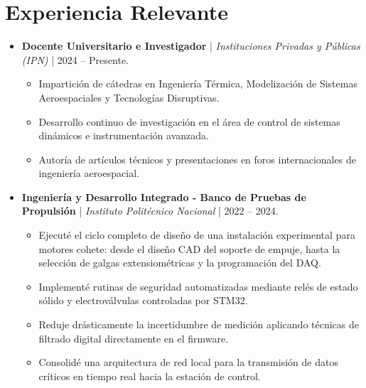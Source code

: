 \documentclass[10pt,letterpaper]{article}
\begin{document}
\section*{Experiencia Relevante}
\begin{itemize}[leftmargin=*, itemsep=0.5ex]
    \item \textbf{Docente Universitario e Investigador} | \textit{Instituciones Privadas y Públicas (IPN)} | 2024 -- Presente.
    \begin{itemize}[itemsep=0.1ex]
        \item Impartición de cátedras en Ingeniería Térmica, Modelización de Sistemas Aeroespaciales y Tecnologías Disruptivas.
        \item Desarrollo continuo de investigación en el área de control de sistemas dinámicos e instrumentación avanzada.
        \item Autoría de artículos técnicos y presentaciones en foros internacionales de ingeniería aeroespacial.
    \end{itemize}
    \item \textbf{Ingeniería y Desarrollo Integrado - Banco de Pruebas de Propulsión} | \textit{Instituto Politécnico Nacional} | 2022 -- 2024.
    \begin{itemize}[itemsep=0.1ex]
        \item Ejecuté el ciclo completo de diseño de una instalación experimental para motores cohete: desde el diseño CAD del soporte de empuje, hasta la selección de galgas extensiométricas y la programación del DAQ.
        \item Implementé rutinas de seguridad automatizadas mediante relés de estado sólido y electroválvulas controladas por STM32.
        \item Reduje drásticamente la incertidumbre de medición aplicando técnicas de filtrado digital directamente en el firmware.
        \item Consolidé una arquitectura de red local para la transmisión de datos críticos en tiempo real hacia la estación de control.
    \end{itemize}
\end{itemize}
\end{document}
